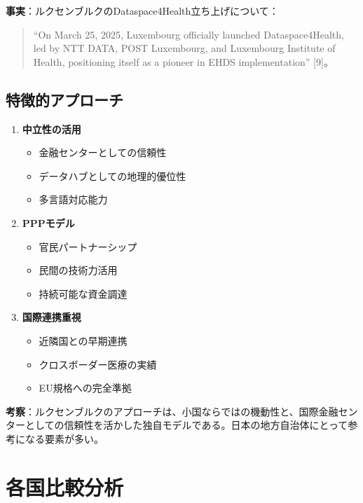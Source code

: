 \documentclass[
  a4paper,
  a4paper,
  11pt]{ltjsbook}
\providecommand{\tightlist}{%
  \setlength{\itemsep}{0pt}\setlength{\parskip}{0pt}}
\begin{document}
\textbf{事実}：ルクセンブルクのDataspace4Health立ち上げについて：

\begin{quote}
``On March 25, 2025, Luxembourg officially launched Dataspace4Health,
led by NTT DATA, POST Luxembourg, and Luxembourg Institute of Health,
positioning itself as a pioneer in EHDS implementation'' {[}9{]}。
\end{quote}

\subsection{特徴的アプローチ}\label{ux7279ux5fb4ux7684ux30a2ux30d7ux30edux30fcux30c1}

\begin{enumerate}
\def\labelenumi{\arabic{enumi}.}
\tightlist
\item
  \textbf{中立性の活用}

  \begin{itemize}
  \tightlist
  \item
    金融センターとしての信頼性
  \item
    データハブとしての地理的優位性
  \item
    多言語対応能力
  \end{itemize}
\item
  \textbf{PPPモデル}

  \begin{itemize}
  \tightlist
  \item
    官民パートナーシップ
  \item
    民間の技術力活用
  \item
    持続可能な資金調達
  \end{itemize}
\item
  \textbf{国際連携重視}

  \begin{itemize}
  \tightlist
  \item
    近隣国との早期連携
  \item
    クロスボーダー医療の実績
  \item
    EU規格への完全準拠
  \end{itemize}
\end{enumerate}

\textbf{考察}：ルクセンブルクのアプローチは、小国ならではの機動性と、国際金融センターとしての信頼性を活かした独自モデルである。日本の地方自治体にとって参考になる要素が多い。

\section{各国比較分析}\label{ux5404ux56fdux6bd4ux8f03ux5206ux6790}
\end{document}
